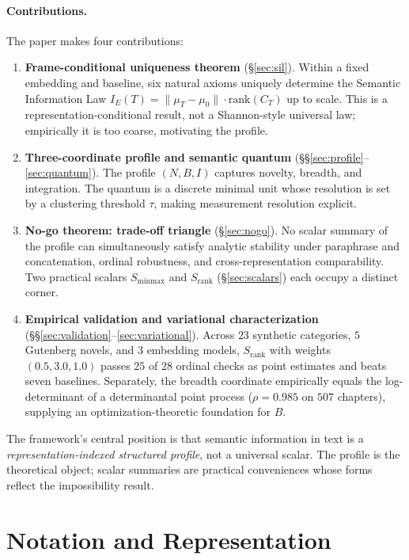 \documentclass[11pt]{article}
\begin{document}
\paragraph{Contributions.} The paper makes four contributions:
\begin{enumerate}
\item \textbf{Frame-conditional uniqueness theorem} (\S\ref{sec:sil}). Within a fixed embedding and baseline, six natural axioms uniquely determine the Semantic Information Law $I_E(T) = \|\mu_T - \mu_0\| \cdot \mathrm{rank}(C_T)$ up to scale. This is a representation-conditional result, not a Shannon-style universal law; empirically it is too coarse, motivating the profile.
\item \textbf{Three-coordinate profile and semantic quantum} (\S\S\ref{sec:profile}--\ref{sec:quantum}). The profile $(N, B, I)$ captures novelty, breadth, and integration. The quantum is a discrete minimal unit whose resolution is set by a clustering threshold $\tau$, making measurement resolution explicit.
\item \textbf{No-go theorem: trade-off triangle} (\S\ref{sec:nogo}). No scalar summary of the profile can simultaneously satisfy analytic stability under paraphrase and concatenation, ordinal robustness, and cross-representation comparability. Two practical scalars $S_{\mathrm{minmax}}$ and $S_{\mathrm{rank}}$ (\S\ref{sec:scalars}) each occupy a distinct corner.
\item \textbf{Empirical validation and variational characterization} (\S\S\ref{sec:validation}--\ref{sec:variational}). Across $23$ synthetic categories, $5$ Gutenberg novels, and $3$ embedding models, $S_{\mathrm{rank}}$ with weights $(0.5, 3.0, 1.0)$ passes $25$ of $28$ ordinal checks as point estimates and beats seven baselines. Separately, the breadth coordinate empirically equals the log-determinant of a determinantal point process ($\rho = 0.985$ on $507$ chapters), supplying an optimization-theoretic foundation for $B$.
\end{enumerate}

The framework's central position is that semantic information in text is a \emph{representation-indexed structured profile}, not a universal scalar. The profile is the theoretical object; scalar summaries are practical conveniences whose forms reflect the impossibility result.

\section{Notation and Representation}\label{sec:notation}
\end{document}
